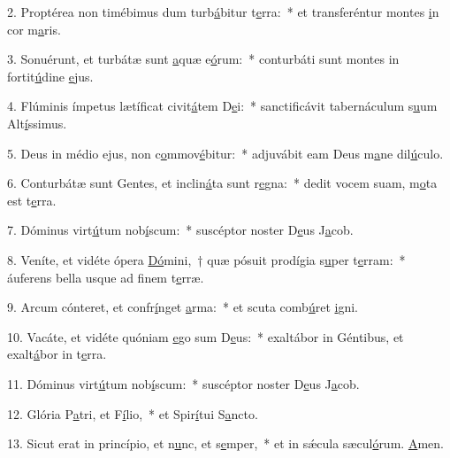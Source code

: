 2. Proptérea non timébimus dum turb\uline{á}bitur t\uline{e}rra:~* et transferéntur montes \uline{i}n cor m\uline{a}ris.\par 
3. Sonuérunt, et turbátæ sunt \uline{a}quæ e\uline{ó}rum:~* conturbáti sunt montes in fortit\uline{ú}dine \uline{e}jus.\par 
4. Flúminis ímpetus lætíficat civit\uline{á}tem D\uline{e}i:~* sanctificávit tabernáculum s\uline{u}um Alt\uline{í}ssimus.\par 
5. Deus in médio ejus, non c\uline{o}mmov\uline{é}bitur:~* adjuvábit eam Deus m\uline{a}ne dil\uline{ú}culo.\par 
6. Conturbátæ sunt Gentes, et inclin\uline{á}ta sunt r\uline{e}gna:~* dedit vocem suam, m\uline{o}ta est t\uline{e}rra.\par 
7. Dóminus virt\uline{ú}tum nob\uline{í}scum:~* suscéptor noster D\uline{e}us J\uline{a}cob.\par 
8. Veníte, et vidéte ópera \uline{Dó}mini,~† quæ pósuit prodígia s\uline{u}per t\uline{e}rram:~* áuferens bella usque ad f\uline{i}nem t\uline{e}rræ.\par 
9. Arcum cónteret, et confr\uline{í}nget \uline{a}rma:~* et scuta comb\uline{ú}ret \uline{i}gni.\par 
10. Vacáte, et vidéte quóniam \uline{e}go sum D\uline{e}us:~* exaltábor in Géntibus, et exalt\uline{á}bor in t\uline{e}rra.\par 
11. Dóminus virt\uline{ú}tum nob\uline{í}scum:~* suscéptor noster D\uline{e}us J\uline{a}cob.\par 
12. Glória P\uline{a}tri, et F\uline{í}lio,~* et Spir\uline{í}tui S\uline{a}ncto.\par 
13. Sicut erat in princípio, et n\uline{u}nc, et s\uline{e}mper,~* et in sǽcula sæcul\uline{ó}rum. \uline{A}men.\par 
